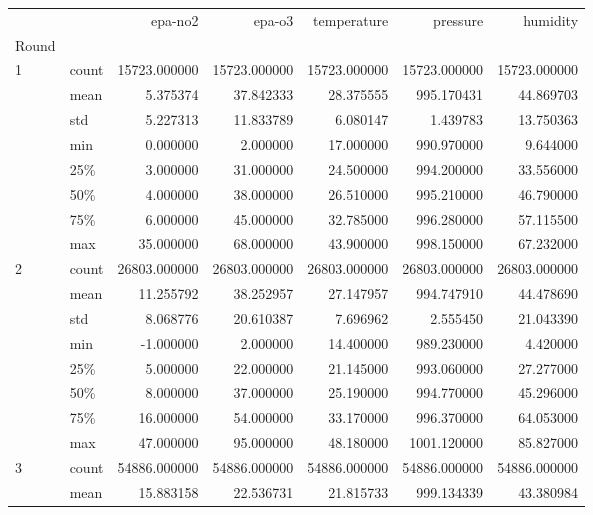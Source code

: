 \begin{tabular}{llrrrrr}
\toprule
  &       &       epa-no2 &        epa-o3 &   temperature &      pressure &      humidity \\
Round & {} &               &               &               &               &               \\
\midrule
1 & count &  15723.000000 &  15723.000000 &  15723.000000 &  15723.000000 &  15723.000000 \\
  & mean &      5.375374 &     37.842333 &     28.375555 &    995.170431 &     44.869703 \\
  & std &      5.227313 &     11.833789 &      6.080147 &      1.439783 &     13.750363 \\
  & min &      0.000000 &      2.000000 &     17.000000 &    990.970000 &      9.644000 \\
  & 25\% &      3.000000 &     31.000000 &     24.500000 &    994.200000 &     33.556000 \\
  & 50\% &      4.000000 &     38.000000 &     26.510000 &    995.210000 &     46.790000 \\
  & 75\% &      6.000000 &     45.000000 &     32.785000 &    996.280000 &     57.115500 \\
  & max &     35.000000 &     68.000000 &     43.900000 &    998.150000 &     67.232000 \\
2 & count &  26803.000000 &  26803.000000 &  26803.000000 &  26803.000000 &  26803.000000 \\
  & mean &     11.255792 &     38.252957 &     27.147957 &    994.747910 &     44.478690 \\
  & std &      8.068776 &     20.610387 &      7.696962 &      2.555450 &     21.043390 \\
  & min &     -1.000000 &      2.000000 &     14.400000 &    989.230000 &      4.420000 \\
  & 25\% &      5.000000 &     22.000000 &     21.145000 &    993.060000 &     27.277000 \\
  & 50\% &      8.000000 &     37.000000 &     25.190000 &    994.770000 &     45.296000 \\
  & 75\% &     16.000000 &     54.000000 &     33.170000 &    996.370000 &     64.053000 \\
  & max &     47.000000 &     95.000000 &     48.180000 &   1001.120000 &     85.827000 \\
3 & count &  54886.000000 &  54886.000000 &  54886.000000 &  54886.000000 &  54886.000000 \\
  & mean &     15.883158 &     22.536731 &     21.815733 &    999.134339 &     43.380984 \\

\end{tabular}
